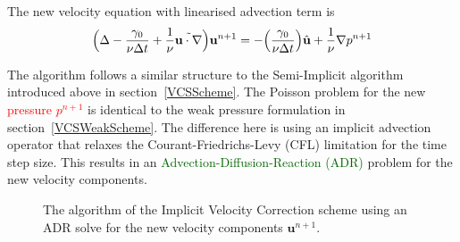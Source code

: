 The new velocity equation with linearised advection term is
\begin{equation}
    \Bigl(\Delta-\frac{\gamma_0}{\nu \Delta t} + \frac{1}{\nu} \tilde{\mathbf{u} \cdot \nabla}\Bigr)\mathbf{u}^{n+1}=-\Bigl(\frac{\gamma_0}{\nu \Delta t}\Bigr)\hat{\mathbf{u}} + \frac{1}{\nu} \nabla p^{n+1}
  \label{eqn.velocityadr}
\end{equation}

The algorithm follows a similar structure to the Semi-Implicit 
algorithm introduced above in section~\ref{VCSScheme}.
The Poisson problem for the new \textcolor{red}{pressure $p^{n+1}$} is 
identical to the weak pressure formulation in section~\ref{VCSWeakScheme}.
The difference here is using an implicit advection operator that relaxes 
the Courant-Friedrichs-Levy (CFL) limitation for the time step size.
This results in an \textcolor{darkgreen}{Advection-Diffusion-Reaction (ADR)} problem for the new velocity components.

\begin{figure}[!htbp]
\centering
{}
\label{fig.VCSImplicitAlgorithm}
\caption{The algorithm of the Implicit Velocity Correction scheme using an 
ADR solve for the new velocity components $\mathbf{u}^{n+1}$.}
\end{figure}

